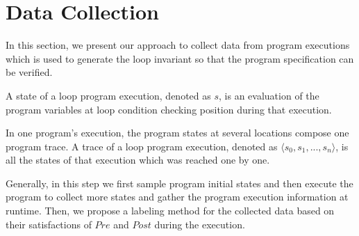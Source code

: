 
\section{Data Collection} %
\label{sec:sampling}

In this section, we present our approach to collect data from program executions 
which is used to generate the loop invariant so that the program specification can be verified.

\begin{definition}[State]
A state of a loop program execution, denoted as $s$, is an evaluation of the program variables at loop condition checking position during that execution. 
\end{definition}
\begin{definition}[Trace]
In one program's execution, the program states at several locations compose one program trace.
A trace of a loop program execution, denoted as $\langle s_0, s_1, ..., s_n\rangle$, is all the states of that execution which was reached one by one. 
\end{definition}

Generally, in this step we first sample program initial states and 
then execute the program to collect more states and gather the program execution information at runtime.
Then, we propose a labeling method for the collected data
based on their satisfactions of $\mathit{Pre}$ and $\mathit{Post}$ during the execution. 

